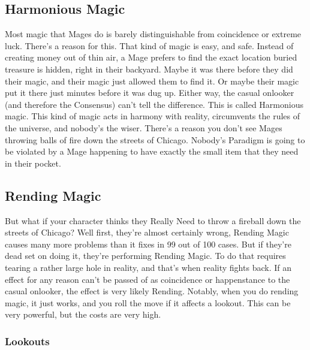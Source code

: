 \documentclass[
]{article}
\begin{document}
\hypertarget{harmonious-magic}{%
\subsection{Harmonious Magic}\label{harmonious-magic}}

Most magic that Mages do is barely distinguishable from coincidence or
extreme luck. There's a reason for this. That kind of magic is easy, and
safe. Instead of creating money out of thin air, a Mage prefers to find
the exact location buried treasure is hidden, right in their backyard.
Maybe it was there before they did their magic, and their magic just
allowed them to find it. Or maybe their magic put it there just minutes
before it was dug up. Either way, the casual onlooker (and therefore the
Consensus) can't tell the difference. This is called Harmonious magic.
This kind of magic acts in harmony with reality, circumvents the rules
of the universe, and nobody's the wiser. There's a reason you don't see
Mages throwing balls of fire down the streets of Chicago. Nobody's
Paradigm is going to be violated by a Mage happening to have exactly the
small item that they need in their pocket.

\hypertarget{rending-magic}{%
\subsection{Rending Magic}\label{rending-magic}}

But what if your character thinks they Really Need to throw a fireball
down the streets of Chicago? Well first, they're almost certainly wrong,
Rending Magic causes many more problems than it fixes in 99 out of 100
cases. But if they're dead set on doing it, they're performing Rending
Magic. To do that requires tearing a rather large hole in reality, and
that's when reality fights back. If an effect for any reason can't be
passed of as coincidence or happenstance to the casual onlooker, the
effect is very likely Rending. Notably, when you do rending magic, it
just works, and you roll the move if it affects a lookout. This can be
very powerful, but the costs are very high.

\hypertarget{lookouts}{%
\subsubsection{Lookouts}\label{lookouts}}
\end{document}
